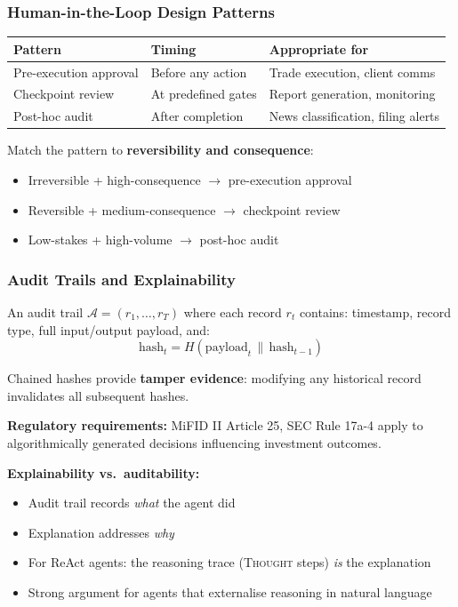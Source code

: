 \documentclass[9pt,t]{beamer}
\begin{document}
\begin{frame}
\frametitle{Human-in-the-Loop Design Patterns}

\begin{center}
\begin{tabular}{lll}
\toprule
\textbf{Pattern} & \textbf{Timing} & \textbf{Appropriate for} \\
\midrule
Pre-execution approval & Before any action & Trade execution, client comms \\
Checkpoint review & At predefined gates & Report generation, monitoring \\
Post-hoc audit & After completion & News classification, filing alerts \\
\bottomrule
\end{tabular}
\end{center}

\medskip
Match the pattern to \textbf{reversibility and consequence}:
\begin{itemize}
  \item Irreversible + high-consequence $\to$ pre-execution approval
  \item Reversible + medium-consequence $\to$ checkpoint review
  \item Low-stakes + high-volume $\to$ post-hoc audit
\end{itemize}
\end{frame}

\begin{frame}
\frametitle{Audit Trails and Explainability}

An audit trail $\mathcal{A} = (r_1, \ldots, r_T)$ where each record $r_t$ contains:
timestamp, record type, full input/output payload, and:
\[
  \text{hash}_t = H(\text{payload}_t \,\|\, \text{hash}_{t-1})
\]

Chained hashes provide \textbf{tamper evidence}: modifying any historical record
invalidates all subsequent hashes.

\medskip
\textbf{Regulatory requirements:}
MiFID II Article 25, SEC Rule 17a-4 apply to algorithmically generated decisions
influencing investment outcomes.

\medskip
\textbf{Explainability vs.\ auditability:}
\begin{itemize}
  \item Audit trail records \emph{what} the agent did
  \item Explanation addresses \emph{why}
  \item For ReAct agents: the reasoning trace (\textsc{Thought} steps) \emph{is} the explanation
  \item Strong argument for agents that externalise reasoning in natural language
\end{itemize}
\end{frame}
\end{document}
